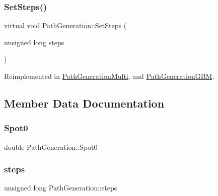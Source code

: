 \hypertarget{classPathGeneration_afc14af2b771829ca2581463e4e4c1213}{}\label{classPathGeneration_afc14af2b771829ca2581463e4e4c1213} 
\subsubsection{\texorpdfstring{Set\+Steps()}{SetSteps()}}
{\footnotesize\ttfamily virtual void Path\+Generation\+::\+Set\+Steps (\begin{DoxyParamCaption}\item[{unsigned long}]{steps\+\_\+ }\end{DoxyParamCaption})\hspace{0.3cm}{\ttfamily [virtual]}}



Reimplemented in \hyperlink{classPathGenerationMulti_ac650e3d724dc4cf3443305b8d1f48a4d}{Path\+Generation\+Multi}, and \hyperlink{classPathGenerationGBM_ad6e5900646658170c9491b2897c3a4bf}{Path\+Generation\+G\+BM}.



\subsection{Member Data Documentation}
\hypertarget{classPathGeneration_ae476651fa3c08266b79c5e20726c0c67}{}\label{classPathGeneration_ae476651fa3c08266b79c5e20726c0c67} 
\subsubsection{\texorpdfstring{Spot0}{Spot0}}
{\footnotesize\ttfamily double Path\+Generation\+::\+Spot0\hspace{0.3cm}{\ttfamily [protected]}}

\hypertarget{classPathGeneration_acd3ff6bbb1c24794ccc0f39277c671a9}{}\label{classPathGeneration_acd3ff6bbb1c24794ccc0f39277c671a9} 
\subsubsection{\texorpdfstring{steps}{steps}}
{\footnotesize\ttfamily unsigned long Path\+Generation\+::steps\hspace{0.3cm}{\ttfamily [protected]}}

